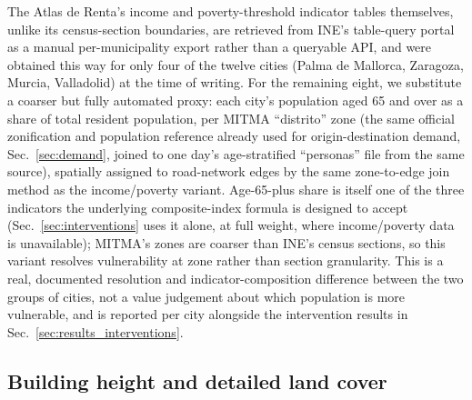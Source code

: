 \documentclass[pdflatex,sn-mathphys-ay]{sn-jnl}
\begin{document}
The Atlas de Renta's income and poverty-threshold indicator tables
themselves, unlike its census-section boundaries, are retrieved from INE's
table-query portal as a manual per-municipality export rather than a
queryable API, and were obtained this way for only four of the twelve
cities (Palma de Mallorca, Zaragoza, Murcia, Valladolid) at the time of
writing. For the remaining eight, we substitute a coarser but fully
automated proxy: each city's population aged 65 and over as a share of
total resident population, per MITMA ``distrito'' zone (the same official
zonification and population reference already used for origin-destination
demand, Sec.~\ref{sec:demand}, joined to one day's age-stratified
``personas'' file from the same source), spatially assigned to road-network
edges by the same zone-to-edge join method as the income/poverty variant.
Age-65-plus share is itself one of the three indicators the underlying
composite-index formula is designed to accept (Sec.~\ref{sec:interventions}
uses it alone, at full weight, where income/poverty data is unavailable);
MITMA's zones are coarser than INE's census sections, so this variant
resolves vulnerability at zone rather than section granularity. This is a
real, documented resolution and indicator-composition difference between
the two groups of cities, not a value judgement about which population is
more vulnerable, and is reported per city alongside the intervention
results in Sec.~\ref{sec:results_interventions}.

\subsection{Building height and detailed land cover}
\label{sec:building_height}
\end{document}
